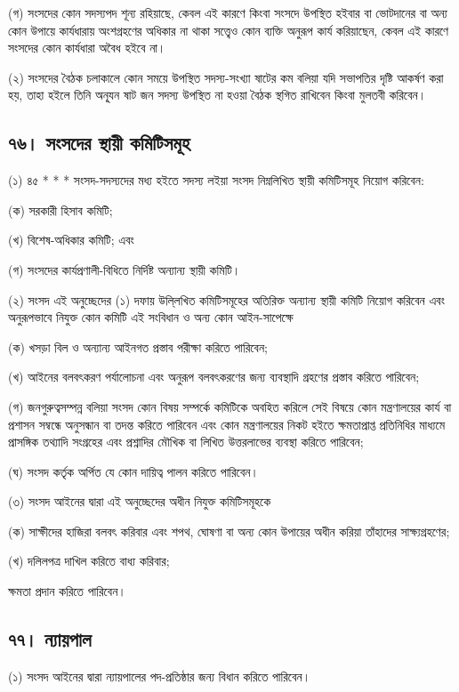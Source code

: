 \documentclass[11pt]{article}
\begin{document}
(গ) সংসদের কোন সদস্যপদ শূন্য রহিয়াছে, কেবল এই কারণে কিংবা সংসদে উপস্থিত
    হইবার বা ভোটদানের বা অন্য কোন উপায়ে কার্যধারায় অংশগ্রহণের অধিকার না থাকা
    সত্ত্বেও কোন ব্যক্তি অনুরূপ কার্য করিয়াছেন, কেবল এই কারণে সংসদের কোন কার্যধারা
    অবৈধ হইবে না।

(২) সংসদের বৈঠক চলাকালে কোন সময়ে উপস্থিত সদস্য-সংখ্যা ষাটের কম বলিয়া যদি
    সভাপতির দৃষ্টি আকর্ষণ করা হয়, তাহা হইলে তিনি অনূ্যন ষাট জন সদস্য উপস্থিত না
    হওয়া বৈঠক স্থগিত রাখিবেন কিংবা মুলতবী করিবেন।

\subsection{৭৬। সংসদের স্থায়ী কমিটিসমূহ}
\label{sec:orgb6dc9fe}
(১) ৪৫ * * * সংসদ-সদস্যদের মধ্য হইতে সদস্য লইয়া সংসদ নিম্নলিখিত স্থায়ী
    কমিটিসমূহ নিয়োগ করিবেন:

(ক) সরকারী হিসাব কমিটি;

(খ) বিশেষ-অধিকার কমিটি; এবং

(গ) সংসদের কার্যপ্রণালী-বিধিতে নির্দিষ্ট অন্যান্য স্থায়ী কমিটি।

(২) সংসদ এই অনুচ্ছেদের (১) দফায় উলি্লখিত কমিটিসমূহের অতিরিক্ত অন্যান্য স্থায়ী
    কমিটি নিয়োগ করিবেন এবং অনুরূপভাবে নিযুক্ত কোন কমিটি এই সংবিধান ও অন্য কোন
    আইন-সাপেক্ষে

(ক) খসড়া বিল ও অন্যান্য আইনগত প্রস্তাব পরীক্ষা করিতে পারিবেন;

(খ) আইনের বলবৎকরণ পর্যালোচনা এবং অনুরূপ বলবৎকরণের জন্য ব্যবস্থাদি গ্রহণের
    প্রস্তাব করিতে পারিবেন;

(গ) জনগুরুত্বসম্পন্ন বলিয়া সংসদ কোন বিষয় সম্পর্কে কমিটিকে অবহিত করিলে সেই
    বিষয়ে কোন মন্ত্রণালয়ের কার্য বা প্রশাসন সম্বন্ধে অনুসন্ধান বা তদন্ত করিতে
    পারিবেন এবং কোন মন্ত্রণালয়ের নিকট হইতে ক্ষমতাপ্রাপ্ত প্রতিনিধির মাধ্যমে
    প্রাসঙ্গিক তথ্যাদি সংগ্রহের এবং প্রশ্নাদির মৌখিক বা লিখিত উত্তরলাভের ব্যবস্থা
    করিতে পারিবেন;

(ঘ) সংসদ কর্তৃক অর্পিত যে কোন দায়িত্ব পালন করিতে পারিবেন।

(৩) সংসদ আইনের দ্বারা এই অনুচ্ছেদের অধীন নিযুক্ত কমিটিসমূহকে

(ক) সাক্ষীদের হাজিরা বলবৎ করিবার এবং শপথ, ঘোষণা বা অন্য কোন উপায়ের অধীন
    করিয়া তাঁহাদের সাক্ষ্যগ্রহণের;

(খ) দলিলপত্র দাখিল করিতে বাধ্য করিবার;

ক্ষমতা প্রদান করিতে পারিবেন।

\subsection{৭৭। ন্যায়পাল}
\label{sec:org2aade2c}
(১) সংসদ আইনের দ্বারা ন্যায়পালের পদ-প্রতিষ্ঠার জন্য বিধান করিতে পারিবেন।
\end{document}
